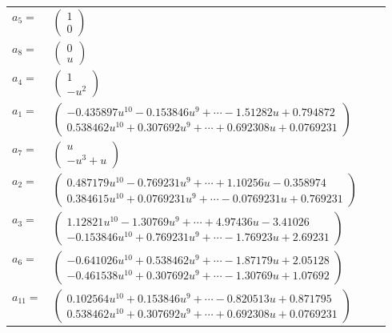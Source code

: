 \documentclass[1p]{elsarticle_modified}
\theoremstyle{definition}
\begin{document}
\begin{tabular}{m{7pt} m{180pt} m{7pt} m{180pt} }
\flushright $a_{5}=$&$\begin{pmatrix}1\\0\end{pmatrix}$ \\
\flushright $a_{8}=$&$\begin{pmatrix}0\\u\end{pmatrix}$ \\
\flushright $a_{4}=$&$\begin{pmatrix}1\\- u^2\end{pmatrix}$ \\
\flushright $a_{1}=$&$\begin{pmatrix}-0.435897 u^{10}-0.153846 u^{9}+\cdots-1.51282 u+0.794872\\0.538462 u^{10}+0.307692 u^{9}+\cdots+0.692308 u+0.0769231\end{pmatrix}$ \\
\flushright $a_{7}=$&$\begin{pmatrix}u\\- u^3+u\end{pmatrix}$ \\
\flushright $a_{2}=$&$\begin{pmatrix}0.487179 u^{10}-0.769231 u^{9}+\cdots+1.10256 u-0.358974\\0.384615 u^{10}+0.0769231 u^{9}+\cdots-0.0769231 u+0.769231\end{pmatrix}$ \\
\flushright $a_{3}=$&$\begin{pmatrix}1.12821 u^{10}-1.30769 u^{9}+\cdots+4.97436 u-3.41026\\-0.153846 u^{10}+0.769231 u^{9}+\cdots-1.76923 u+2.69231\end{pmatrix}$ \\
\flushright $a_{6}=$&$\begin{pmatrix}-0.641026 u^{10}+0.538462 u^{9}+\cdots-1.87179 u+2.05128\\-0.461538 u^{10}+0.307692 u^{9}+\cdots-1.30769 u+1.07692\end{pmatrix}$ \\
\flushright $a_{11}=$&$\begin{pmatrix}0.102564 u^{10}+0.153846 u^{9}+\cdots-0.820513 u+0.871795\\0.538462 u^{10}+0.307692 u^{9}+\cdots+0.692308 u+0.0769231\end{pmatrix}$ \\

\end{tabular}
\end{document}
